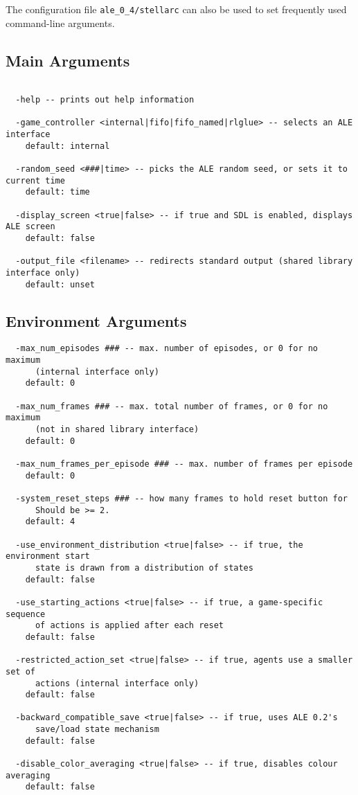 \documentclass[12pt]{article}
\begin{document}
The configuration file \verb+ale_0_4/stellarc+ can also be used to set frequently used
command-line arguments. 

\subsection{Main Arguments}
\small{
\begin{verbatim}

  -help -- prints out help information

  -game_controller <internal|fifo|fifo_named|rlglue> -- selects an ALE interface
    default: internal

  -random_seed <###|time> -- picks the ALE random seed, or sets it to current time
    default: time

  -display_screen <true|false> -- if true and SDL is enabled, displays ALE screen
    default: false

  -output_file <filename> -- redirects standard output (shared library interface only)
    default: unset
\end{verbatim}
}

\subsection{Environment Arguments}

\small{
\begin{verbatim}
  -max_num_episodes ### -- max. number of episodes, or 0 for no maximum 
      (internal interface only)
    default: 0

  -max_num_frames ### -- max. total number of frames, or 0 for no maximum 
      (not in shared library interface)
    default: 0

  -max_num_frames_per_episode ### -- max. number of frames per episode
    default: 0

  -system_reset_steps ### -- how many frames to hold reset button for 
      Should be >= 2.
    default: 4

  -use_environment_distribution <true|false> -- if true, the environment start 
      state is drawn from a distribution of states
    default: false

  -use_starting_actions <true|false> -- if true, a game-specific sequence
      of actions is applied after each reset
    default: false

  -restricted_action_set <true|false> -- if true, agents use a smaller set of 
      actions (internal interface only)
    default: false

  -backward_compatible_save <true|false> -- if true, uses ALE 0.2's 
      save/load state mechanism
    default: false

  -disable_color_averaging <true|false> -- if true, disables colour averaging 
    default: false
\end{verbatim}
}
\end{document}
